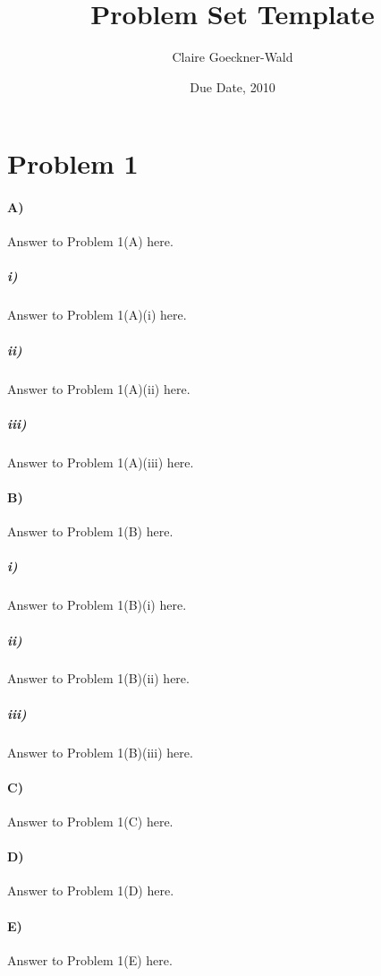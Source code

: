 \documentclass[10pt,letter]{article}
\begin{document}


\title{Problem Set Template}

\author{Claire Goeckner-Wald}

\date{Due Date, 2010}
 
\maketitle 


\section*{Problem 1}

\paragraph{A)} Answer to Problem 1(A) here.

\subparagraph{i)} Answer to Problem 1(A)(i) here.

\subparagraph{ii)} Answer to Problem 1(A)(ii) here.

\subparagraph{iii)} Answer to Problem 1(A)(iii) here.

\paragraph{B)} Answer to Problem 1(B) here.

\subparagraph{i)} Answer to Problem 1(B)(i) here.

\subparagraph{ii)} Answer to Problem 1(B)(ii) here.

\subparagraph{iii)} Answer to Problem 1(B)(iii) here.

\paragraph{C)} Answer to Problem 1(C) here.

\paragraph{D)} Answer to Problem 1(D) here.

\paragraph{E)} Answer to Problem 1(E) here.
\end{document}
